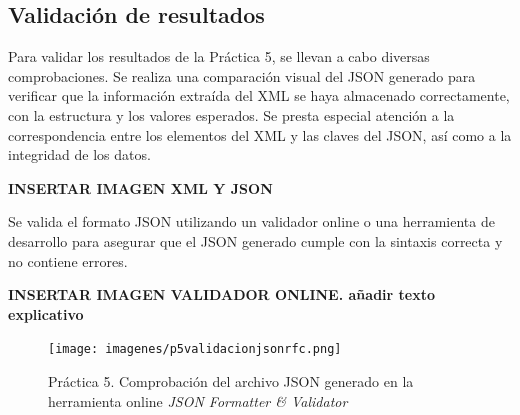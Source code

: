 



\subsection{Validación de resultados}

Para validar los resultados de la Práctica 5, se llevan a cabo diversas comprobaciones. Se realiza una comparación visual del JSON generado para verificar que la información extraída del XML se haya almacenado correctamente, con la estructura y los valores esperados. Se presta especial atención a la correspondencia entre los elementos del XML y las claves del JSON, así como a la integridad de los datos.

\textbf{INSERTAR IMAGEN XML Y JSON}

Se valida el formato JSON utilizando un validador online o una herramienta de desarrollo para asegurar que el JSON generado cumple con la sintaxis correcta y no contiene errores.

\textbf{INSERTAR IMAGEN VALIDADOR ONLINE. añadir texto explicativo}

\begin{figure}[H]
	\centering
	\texttt{[image: imagenes/p5validacionjsonrfc.png]}
	\caption{\label{fig:p5validacionjsonrfc}Práctica 5. Comprobación del archivo JSON generado en la herramienta online \textit{JSON Formatter \& Validator} }
\end{figure}

